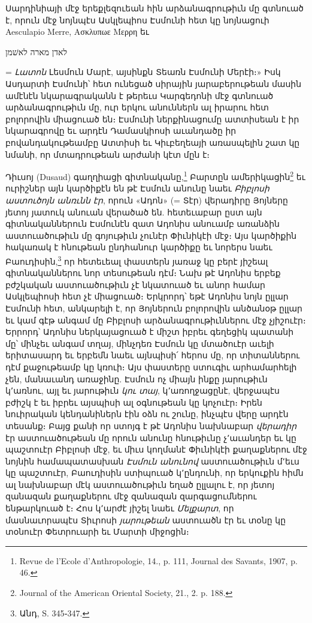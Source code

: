 \documentclass{article}
\begin{document}
{Սարդինիայի մէջ երեքլեզուեան հին արձանագրութիւն մը գտնուած է, որուն մէջ նոյնպէս Ասկլեպիոս Էսմունի հետ կը նոյնացուի Aesculapio Merre, Ασκλυπωε Μερρη եւ \begin{hebrewfont}לאדן מארה לאשׁמן\end{hebrewfont} = \emph{Լատոն} Լեսմուն Մարէ, այսինքն Տեառն Էսմունի Մերէի։» Իսկ Ասդարտի Էսմունի՝ հետ ունեցած սիրային յարաբերութեան մասին ամէնէն նկարագրականն է թերեւս Կարգեդոնի մէջ գտնուած արձանագրութիւն մը, ուր երկու անուններն ալ իրարու հետ բոլորովին միացուած են։ Էսմունի ներքինացումը ատտիսեան է իր նկարագրովը եւ արդէն Դամասկիոսի աւանդածը իր բովանդակութեամբը Ատտիսի եւ Կիւբեղեայի առասպելին շատ կը նմանի, որ մտադրութեան արժանի կէտ մըն է։

Դիւսոյ (Dusaud) գաղղիացի գիտնականը,\footnote{Revue de l'Ecole d'Anthropologie, 14., p. 111, Journal des Savants, 1907, p. 46.} Բարտըն ամերիկացին\footnote{Journal of the American Oriental Society, 21., 2. p. 188.} եւ ուրիշներ այն կարծիքէն են թէ Էսմուն անունը նաեւ \emph{Բիբլոսի աստուծոյն անռւնն էր}, որուն «Ադոն» (= Տէր) վերադիրը Յոյները յետոյ յատուկ անուան վերածած են. հետեւաբար ըստ այն գիտնականներուն Էսմունէն զատ Ադոնիս անուամբ առանձին աստուածութիւն մը գոյութիւն չունէր Փիւնիկէի մէջ։ Այս կարծիքին հակառակ է հնութեան ընդհանուր կարծիքը եւ նորերս նաեւ Բաուդիսին,\footnote{Անդ, S. 345֊347.} որ հետեւեալ փաստերն յառաջ կը բերէ յիշեալ գիտնականներու նոր տեսութեան դէմ։ Նախ թէ Ադոնիս երբեք բժշկական աստուածութիւն չէ նկատուած եւ անոր համար Ասկլեպիոսի հետ չէ միացուած։ Երկրորդ՝ եթէ Ադոնիս նոյն ըլլար Էսմունի հետ, անկարելի է, որ Յոյներուն բոլորովին անծանօթ ըլլար եւ կամ գէթ անգամ մը Բիբլոսի արձանագրութիւններու մէջ չյիշուէր։ Երրորդ՝ Ադոնիս ներկայացուած է միշտ իբրեւ գեղեցիկ պատանի մը՝ մինչեւ անգամ տղայ, մինչդեռ Էսմուն կը մտածուէր աւելի երիտասարդ եւ երբեմն նաեւ այնպիսի՛ հերոս մը, որ տիտաններու դէմ քաջութեամբ կը կռուի։ Այս փաստերը ստուգիւ արհամարհելի չեն, մանաւանդ առաջինը. Էսմուն ոչ միայն ինքը յարութիւն կ՚առնու, այլ եւ յարութիւն \emph{կու տայ}, կ՚առողջացընէ, վերջապէս բժիշկ է եւ իբրեւ այսպիսի ալ օգնութեան կը կոչուէր։ Իրեն նուիրական կենդանիներն էին օձն ու շունը, ինչպէս վերը արդէն տեսանք։ Բայց քանի որ ստոյգ է թէ Ադոնիս նախնաբար \emph{վերադիր} էր աստուածութեան մը որուն անունը հնութիւնը չ՚աւանդեր եւ կը պաշտուէր Բիբլոսի մէջ, եւ միւս կողմանէ Փիւնիկէի քաղաքներու մէջ նոյնին համապատասխան \emph{Էսմուն անունով} աստուածութիւն մ՚եւս կը պաշտուէր, Բաուդիսին ստիպուած կ՚ընդունի, որ երկուքին հիմն ալ նախնաբար մէկ աստուածութիւն եղած ըլլալու է, որ յետոյ զանազան քաղաքներու մէջ զանազան զարգացումներու ենթարկուած է։ Հոս կ՚արժէ յիշել նաեւ \emph{Մելքարտ}, որ մասնաւորապէս Տիւրոսի \emph{յարութեան} աստուածն էր եւ տօնը կը տօնուէր Փետրուարի եւ Մարտի միջոցին։

}
\end{document}
